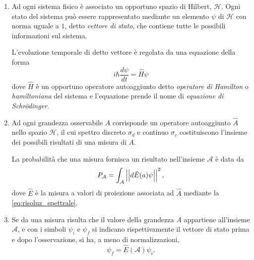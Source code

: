 \begin{enumerate}
  \renewcommand{\theenumi}{\roman{enumi}}
  \item{%
    Ad ogni sistema fisico è associato un opportuno spazio di Hilbert,
    $\mathcal{H}$. Ogni stato del sistema può essere rappresentato
    mediante un elemento $\psi$ di $\mathcal{H}$ con norma uguale a $1$,
    detto \emph{vettore di stato}, che contiene tutte le possibili 
    informazioni sul sistema.

    L'evoluzione temporale di detto vettore è regolata da una equazione
    della forma
    \begin{equation}
      i\hbar\frac{d\psi}{dt} = \hat{H}\psi  \label{eq:schrod}
    \end{equation}
    dove $\hat{H}$ è un opportuno operatore autoaggiunto detto
    \emph{operatore di Hamilton} o \emph{hamiltoniana} del sistema e
    l'equazione prende il nome di \emph{equazione di Schr\"odinger}.
  }
  \item{
    Ad ogni grandezza osservabile $A$ corrisponde un operatore
    autoaggiunto $\hat{A}$ nello spazio $\mathcal{H}$, il cui
    spettro discreto $\sigma_d$ e continuo $\sigma_c$ costituiscono
    l'insieme dei possibili risultati di una misura di $A$.

    La probabilità che una misura fornisca un risultato nell'insieme
    $\mathcal{A}$ è data da
    \begin{equation}
      P_{\mathcal{A}} = \int_{\mathcal{A}} \left|\left|d\hat{E}(a) \psi\right|\right|^2,
      \label{eq:probab}
    \end{equation}
    dove $\hat{E}$ è la misura a valori di proiezione associata
    ad $\hat{A}$ mediante la \eqref{eq:risoluz_spettrale}.
  }
  \item{
    Se da una misura risulta che il valore della grandezza $A$ 
    appartiene all'insieme $\mathcal{A}$, e con i simboli
    $\psi_i$ e $\psi_f$ si indicano rispettivamente il vettore di stato
    prima e dopo l'osservazione, si ha, a meno di normalizzazioni,
    \[
      \psi_f = \hat{E}(\mathcal{A}) \psi_i .
    \]

}
\end{enumerate}
